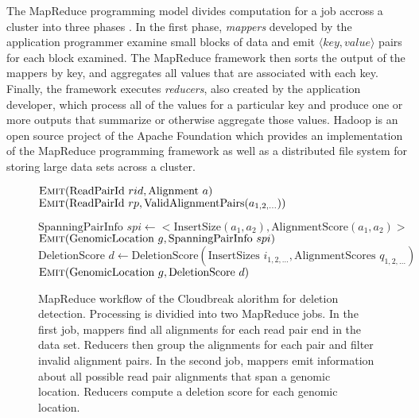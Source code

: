 \documentclass[12pt]{article}
\begin{document}
The MapReduce programming model divides computation for a job accross a cluster into three phases \cite{Dean:2008p277}. In the first phase, \emph{mappers} developed by the application programmer examine small blocks of data and emit $\langle key, value \rangle$ pairs for each block examined. The MapReduce framework then sorts the output of the mappers by key, and aggregates all values that are associated with each key. Finally, the framework executes \emph{reducers}, also created by the application developer, which process all of the values for a particular key and produce one or more outputs that summarize or otherwise aggregate those values. Hadoop is an open source project of the Apache Foundation which provides an implementation of the MapReduce programming framework as well as a distributed file system for storing large data sets across a cluster.

\begin{figure}[p]
\algrenewcommand{}
  \begin{algorithmic}[1]
    \State $\textsc{Emit}(\textrm{ReadPairId }rid, \textrm{Alignment }a)$
    \EndFor
    \EndFunction
    \State $\textsc{Emit}(\textrm{ReadPairId }rp, \textrm{ValidAlignmentPairs}(a_{1,2,\ldots}))$
    \EndFunction
    \EndProcedure

    \State $ \textrm{SpanningPairInfo }spi \gets <\textrm{InsertSize}(a_1,a_2), \textrm{AlignmentScore}(a_1,a_2)>$
    \State $\textsc{Emit}(\textrm{GenomicLocation }g, \textrm{SpanningPairInfo }spi)$
    \EndFor
    \EndFor
    \EndFunction
    \State $\textrm{DeletionScore } d \gets \textrm{DeletionScore}(\textrm{InsertSizes }i_{1,2,\ldots}, \textrm{AlignmentScores }q_{1,2,\ldots})$
    \State $\textsc{Emit}(\textrm{GenomicLocation }g, \textrm{DeletionScore } d)$
    \EndFunction
    \EndProcedure
  \end{algorithmic}
  \caption{MapReduce workflow of the Cloudbreak alorithm for deletion detection. Processing is dividied into two MapReduce jobs. In the first job, mappers find all alignments for each read pair end in the data set. Reducers then group the alignments for each pair and filter invalid alignment pairs. In the second job, mappers emit information about all possible read pair alignments that span a genomic location. Reducers compute a deletion score for each genomic location.}
\label{algo1}
\end{figure}
\end{document}
